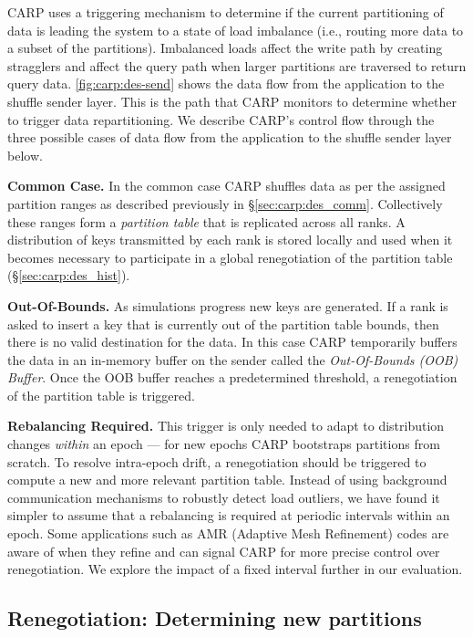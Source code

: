CARP uses a triggering mechanism to determine if the current partitioning of data is leading the
system to a state of load imbalance (i.e., routing more data to a subset of the partitions).
Imbalanced loads affect the write path by creating stragglers and affect the query path when larger
partitions are traversed to return query data.
\autoref{fig:carp:des-send} shows the data flow from the application to the shuffle sender layer.
This is the path that CARP monitors to determine whether to trigger data repartitioning.
We describe CARP's control flow through the three possible cases of data flow from the application
to the shuffle sender layer below.

\textbf{Common Case.
}
In the common case CARP shuffles data as per the assigned partition ranges as described previously
in \S\ref{sec:carp:des_comm}.
Collectively these ranges form a \emph{partition table} that is replicated across all ranks.
A distribution of keys transmitted by each rank is stored locally and used when it becomes
necessary to participate in a global renegotiation of the partition table
(\S\ref{sec:carp:des_hist}).

\enlargethispage{\baselineskip}
\textbf{Out-Of-Bounds.
}
As simulations progress new keys are generated.
If a rank is asked to insert a key that is currently out of the partition table bounds, then there
is no valid destination for the data.
In this case CARP temporarily buffers the data in an in-memory buffer on the sender called the
\emph{Out-Of-Bounds (OOB) Buffer}.
Once the OOB buffer reaches a predetermined threshold, a renegotiation of the partition table is
triggered.

\textbf{Rebalancing Required.
}
This trigger is only needed to adapt to distribution changes \emph{within} an epoch --- for new
epochs CARP bootstraps partitions from scratch.
To resolve intra-epoch drift, a renegotiation should be triggered to compute a new and more
relevant partition table.
Instead of using background communication mechanisms to robustly detect load outliers, we have
found it simpler to assume that a rebalancing is required at periodic intervals within an epoch.
Some applications such as AMR (Adaptive Mesh Refinement) codes are aware of when they refine and
can signal CARP for more precise control over renegotiation.
We explore the impact of a fixed interval further in our evaluation.

\subsection{Renegotiation: Determining new partitions}
\label{sec:carp:des_reneg}

